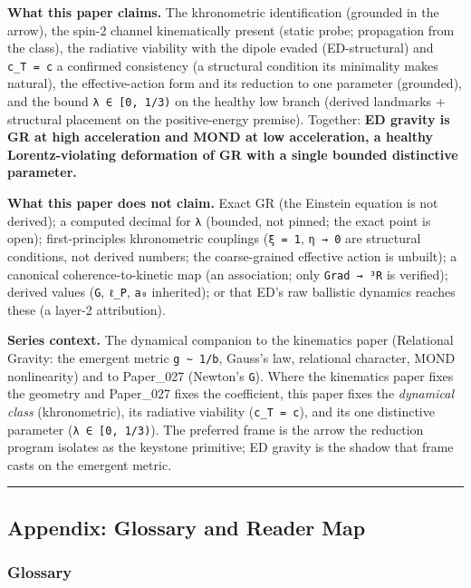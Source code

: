 \documentclass[
]{article}
\begin{document}
\textbf{What this paper claims.} The khronometric identification
(grounded in the arrow), the spin-2 channel kinematically present
(static probe; propagation from the class), the radiative viability with
the dipole evaded (ED-structural) and \texttt{c\_T\ =\ c} a confirmed
consistency (a structural condition its minimality makes natural), the
effective-action form and its reduction to one parameter (grounded), and
the bound \texttt{λ\ ∈\ {[}0,\ 1/3)} on the healthy low branch (derived
landmarks + structural placement on the positive-energy premise).
Together: \textbf{ED gravity is GR at high acceleration and MOND at low
acceleration, a healthy Lorentz-violating deformation of GR with a
single bounded distinctive parameter.}

\textbf{What this paper does not claim.} Exact GR (the Einstein equation
is not derived); a computed decimal for \texttt{λ} (bounded, not pinned;
the exact point is open); first-principles khronometric couplings
(\texttt{ξ\ =\ 1}, \texttt{η\ →\ 0} are structural conditions, not
derived numbers; the coarse-grained effective action is unbuilt); a
canonical coherence-to-kinetic map (an association; only
\texttt{Grad\ →\ ³R} is verified); derived values (\texttt{G},
\texttt{ℓ\_P}, \texttt{a₀} inherited); or that ED's raw ballistic
dynamics reaches these (a layer-2 attribution).

\textbf{Series context.} The dynamical companion to the kinematics paper
(Relational Gravity: the emergent metric
\texttt{g\ \textasciitilde{}\ 1/b}, Gauss's law, relational character,
MOND nonlinearity) and to Paper\_027 (Newton's \texttt{G}). Where the
kinematics paper fixes the geometry and Paper\_027 fixes the
coefficient, this paper fixes the \emph{dynamical class} (khronometric),
its radiative viability (\texttt{c\_T\ =\ c}), and its one distinctive
parameter (\texttt{λ\ ∈\ {[}0,\ 1/3)}). The preferred frame is the arrow
the reduction program isolates as the keystone primitive; ED gravity is
the shadow that frame casts on the emergent metric.

\begin{center}\rule{0.5\linewidth}{0.5pt}\end{center}

\subsection{Appendix: Glossary and Reader
Map}\label{appendix-glossary-and-reader-map}

\subsubsection{Glossary}\label{glossary}
\end{document}
